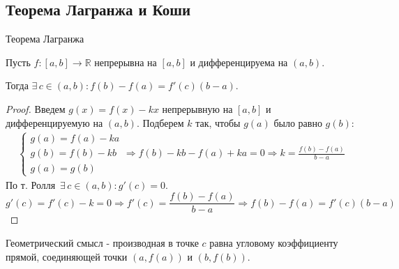 \subsection{Теорема Лагранжа и Коши \href{https://youtu.be/OXDjegAsmSU?t=5760}{\Walley}}
\begin{theorem-non}
    Теорема Лагранжа

    Пусть $f: [a, b] \to \mathbb{R}$ непрерывна на $[a, b]$ и дифференцируема на $(a, b)$.

    Тогда $\exists \, c \in (a, b) : f(b) - f(a) = f'(c)(b - a)$.
\end{theorem-non}
\begin{proof}
    Введем $g(x) = f(x) - kx$ непрерывную на $[a, b]$ и дифференцируемую на $(a, b)$. Подберем $k$ так, чтобы $g(a)$ было равно $g(b)$:
    \begin{gather*}
        \begin{cases}
            g(a) = f(a) - ka \\
            g(b) = f(b) - kb \\
            g(a) = g(b)
        \end{cases} 
        \Rightarrow f(b) - kb - f(a) + ka = 0 \Rightarrow k = \frac{f(b) - f(a)}{b - a}
    \end{gather*}
    По т. Ролля $ \, \exists \, c \in (a, b) : g'(c) = 0$.
    \[ g'(c) = f'(c) - k = 0 \Rightarrow f'(c) = \frac{f(b) - f(a)}{b - a} \Rightarrow f(b) - f(a) = f'(c)(b - a) \]
\end{proof}
\begin{notice}
     Геометрический смысл - производная в точке $c$ равна угловому коэффициенту прямой, 
     соединяющей точки $(a, f(a))$ и $(b, f(b))$.
\end{notice}

